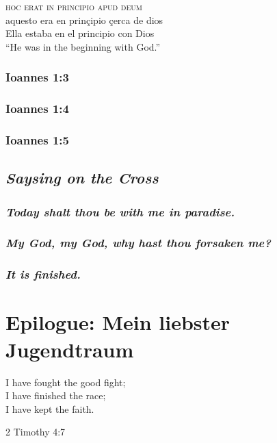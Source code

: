 \documentclass{report}[12pt]
\begin{document}
\begin{exe}
  \sn
  \glll
  \textsc{hoc} \textsc{erat} \textsc{in} \textsc{principio} \textsc{apud} \textsc{deum} \\
  aquesto era en prin\c{c}ipio {\c{c}erca de} dios \\
  Ella estaba {en el} principio con Dios \\
  \glt
  ``He was in the beginning with God.''
\end{exe}

\subsection{Ioannes 1:3}

\subsection{Ioannes 1:4}

\subsection{Ioannes 1:5}

\section{\emph{Saysing on the Cross}}

\subsection{\emph{Today shalt thou be with me in paradise.}}

\subsection{\emph{My God, my God, why hast thou forsaken me?}}

\subsection{\emph{It is finished.}}

\chapter{Epilogue: Mein liebster Jugendtraum}

\epigraph{I have fought the good fight; \\ I have finished the race; \\ I have kept the faith.}{2 Timothy 4:7}
\end{document}
